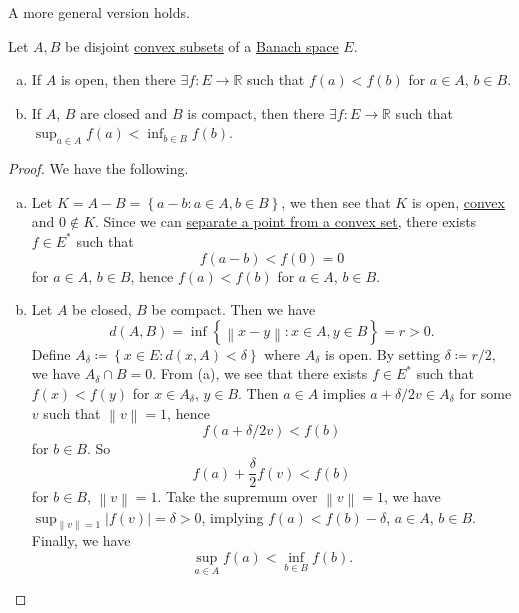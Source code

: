 A more general version holds.

\begin{theorem}\label{thm:separation-of-convex-sets}
	Let \(A, B\) be disjoint \hyperref[def:convex-set]{convex subsets} of a \hyperref[def:Banach-space]{Banach space} \(E\).
	\begin{enumerate}[(a)]
		\item If \(A\) is open, then there \(\exists f\colon E\to \mathbb{R} \) such that \(f(a) < f(b)\) for \(a\in A\), \(b\in B\).
		\item If \(A\), \(B\) are closed and \(B\) is compact, then there \(\exists f\colon E\to \mathbb{R} \) such that \(\sup _{a\in A} f(a) < \inf _{b\in B}f(b)\).
	\end{enumerate}
\end{theorem}
\begin{proof}
	We have the following.
	\begin{enumerate}[(a)]
		\item Let \(K = A - B = \left\{ a - b\colon a\in A, b\in B \right\} \), we then see that \(K\) is open, \hyperref[def:convex-set]{convex} and \(0 \notin K\). Since we can \hyperref[thm:separation-of-a-point-from-a-convex-set]{separate a point from a convex set}, there exists \(f\in E^{\ast} \) such that
		      \[
			      f(a - b) < f(0) = 0
		      \]
		      for \(a\in A\), \(b\in B\), hence \(f(a) < f(b)\) for \(a\in A\), \(b\in B\).
		\item Let \(A\) be closed, \(B\) be compact. Then we have
		      \[
			      d(A, B) = \inf \left\{ \left\lVert x-y\right\rVert \colon x\in A, y\in B \right\} = r > 0.
		      \]
		      Define \(A_\delta \coloneqq \left\{ x\in E\colon d(x, A) < \delta  \right\} \) where \(A_\delta \) is open. By setting \(\delta \coloneqq r / 2\), we have \(A_\delta \cap B = 0\). From (a), we see that there exists \(f\in E^{\ast} \) such that \(f(x) < f(y)\) for \(x\in A_\delta \), \(y\in B\). Then \(a\in A\) implies \(a + \delta /2 v \in A_\delta \) for some \(v\) such that \(\left\lVert v\right\rVert = 1\), hence
		      \[
			      f(a + \delta / 2 v)< f(b)
		      \]
		      for \(b\in B\). So
		      \[
			      f(a) + \frac{\delta }{2}f(v) < f(b)
		      \]
		      for \(b\in B\), \(\left\lVert v\right\rVert = 1\). Take the supremum over \(\left\lVert v\right\rVert = 1\), we have \(\sup _{\left\lVert v\right\rVert = 1} \left\vert f(v) \right\vert = \delta > 0\), implying \(f(a) < f(b) - \delta \), \(a\in A\), \(b\in B\). Finally, we have
		      \[
			      \sup _{a\in A}f(a) < \inf _{b\in B}f(b).
		      \]
	\end{enumerate}
\end{proof}